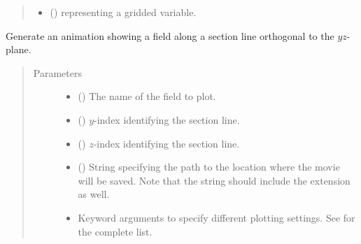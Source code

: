 \documentclass[letterpaper,10pt,english]{sphinxmanual}
\begin{document}
\begin{fulllineitems}
\begin{fulllineitems}
\begin{quote}
\begin{description}
\begin{itemize}
\item {} 
 () \textendash{}  representing a gridded variable.

\end{itemize}

\end{description}\end{quote}

\end{fulllineitems}


\begin{fulllineitems}
\label{\detokenize{api:tasmania.storages.grid_data.GridData.animation_profile_x}}
Generate an animation showing a field along a section line orthogonal to the \(yz\)-plane.
\begin{quote}\begin{description}
\item[{Parameters}] \leavevmode\begin{itemize}
\item {} 
 () \textendash{} The name of the field to plot.

\item {} 
 () \textendash{} \(y\)-index identifying the section line.

\item {} 
 () \textendash{} \(z\)-index identifying the section line.

\item {} 
 () \textendash{} String specifying the path to the location where the movie will be saved.
Note that the string should include the extension as well.

\item {} 
 \textendash{} Keyword arguments to specify different plotting settings.
See {\hyperref[\detokenize{api:tasmania.utils.utils_plot.animation_profile_x}]{}} for the complete list.


\end{itemize}
\end{description}
\end{quote}
\end{fulllineitems}
\end{fulllineitems}
\end{document}
